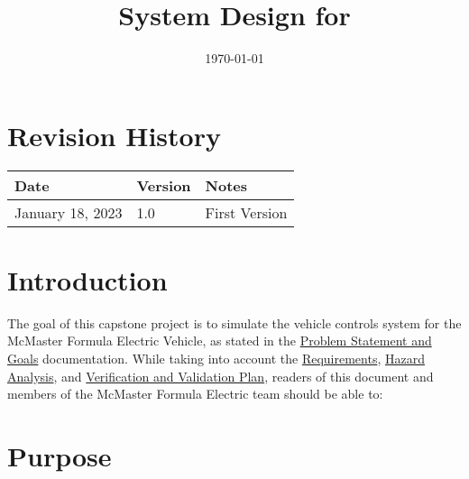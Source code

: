\documentclass[12pt, titlepage]{article}
\begin{document}
\title{System Design for \progname{}} 
\author{\authname}
\date{\today}

\maketitle


\section*{Revision History}

\begin{tabularx}{\textwidth}{p{3cm}p{2cm}X}
\toprule {\bf Date} & {\bf Version} & {\bf Notes}\\
\midrule
January 18, 2023 & 1.0 & First Version\\
\bottomrule
\end{tabularx}

\newpage



\newpage

\tableofcontents

\newpage

\listoftables

\listoffigures

\newpage


\section{Introduction}

The goal of this capstone project is to simulate the vehicle controls system for the McMaster Formula Electric Vehicle, as stated in the \href{https://github.com/Dharakverma/vehicle_control_system/blob/main/docs/ProblemStatementAndGoals/ProblemStatement.pdf}{Problem Statement and Goals} documentation. While taking into account the  \href{https://github.com/Dharakverma/vehicle_control_system/blob/main/docs/SRS/SRS.pdf}{Requirements}, \href{https://github.com/Dharakverma/vehicle_control_system/blob/main/docs/HazardAnalysis/HazardAnalysis.pdf}{Hazard Analysis}, and \href{https://github.com/Dharakverma/vehicle_control_system/blob/main/docs/VnVPlan/VnV_Plan.pdf}{Verification and Validation Plan}, readers of this document and members of the McMaster Formula Electric team should be able to:

\section{Purpose}
\end{document}
